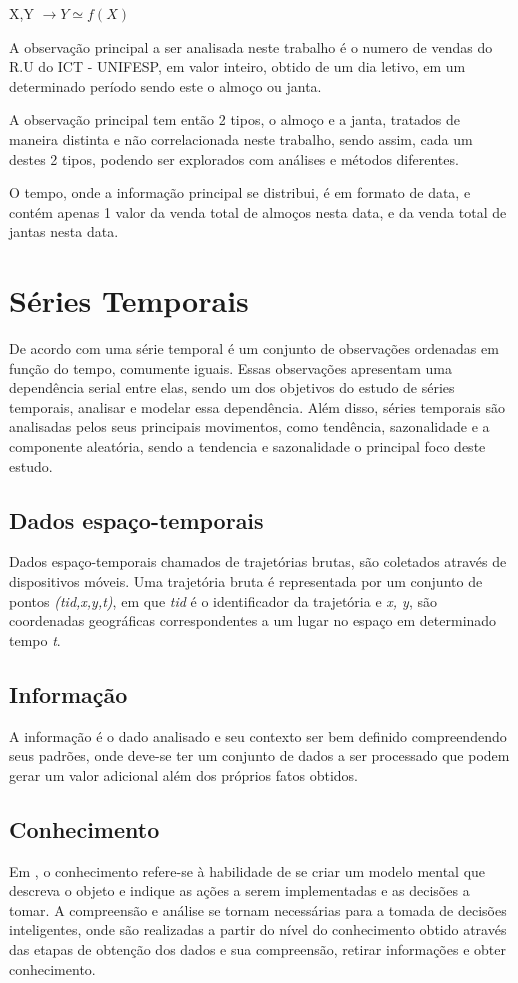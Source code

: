 \documentclass[	12pt, Times, openright, twoside, a4paper, english, brazil]{abntex2}
\begin{document}
X,Y $\rightarrow Y \simeq f(X) $

A observação principal a ser analisada neste trabalho é o numero de vendas do R.U do ICT - UNIFESP, em valor inteiro, obtido de um dia letivo, em um determinado período sendo este o almoço ou janta.

A observação principal tem então 2 tipos, o almoço e a janta, tratados de maneira distinta e não correlacionada neste trabalho, sendo assim, cada um destes 2 tipos, podendo ser explorados com análises e métodos diferentes.

O tempo, onde a informação principal se distribui, é em formato de data, e contém apenas 1 valor da venda total de almoços nesta data, e da venda total de jantas nesta data.

\section{Séries Temporais}
De acordo com  \cite{Morettin1987} uma série temporal é um conjunto de observações ordenadas em função do tempo, comumente iguais. Essas observações apresentam uma dependência serial entre elas, sendo um dos objetivos do estudo de séries temporais, analisar e modelar essa dependência. Além disso, séries temporais são analisadas pelos seus principais movimentos, como tendência, sazonalidade e a componente aleatória, sendo a tendencia e sazonalidade o principal foco deste estudo.

\subsection{Dados espaço-temporais}
Dados espaço-temporais chamados de trajetórias brutas, são coletados através de dispositivos móveis. Uma trajetória bruta é representada por um conjunto de pontos \textit{(tid,x,y,t)}, em que \textit{tid} é o identificador da trajetória e \textit{x, y}, são coordenadas geográficas correspondentes a um lugar no espaço em determinado tempo \textit{t}.

\subsection{Informação}
A informação é o dado analisado e seu contexto ser bem definido compreendendo seus padrões, onde deve-se ter um conjunto de dados a ser processado que podem gerar um valor adicional além dos próprios fatos obtidos.

\subsection{Conhecimento}
Em \cite{Rezende2003}, o conhecimento refere-se à habilidade de se criar um modelo mental que descreva o objeto e indique as ações a serem implementadas e as decisões a tomar. A compreensão e análise se tornam necessárias para a tomada de decisões inteligentes, onde são realizadas a partir do nível do conhecimento obtido através das etapas de obtenção dos dados e sua compreensão, retirar informações e obter conhecimento.\\
\end{document}
